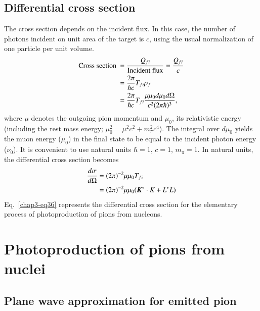 \subsection{Differential cross section}\label{chap3-sec4.2}

The cross section depends on the incident flux. In this case, the number of photons incident on unit area of the target is $c$, using the usual normalization of one particle per unit volume.
\begin{align}
  \text{Cross section}~ & = \frac{Q_{fi}}{\text{Incident flux}} = \frac{Q_{fi}}{c}\notag \\
  & = \frac{2 \pi}{\hbar c} T_{fi} \rho_ f \notag \\
  & = \frac{2\pi}{\hbar c} T_{fi} \frac{\mu \mu_0 d \mu_0 d \Omega}{c^2 (2 \pi \hbar)^3},\label{chap3-eq35}
\end{align}
where $\mu$ denotes the outgoing pion momentum and $\mu_0$, its relativistic energy (including the rest mass energy; $\mu_0^2 = \mu^2 c^2 + m_\pi^2 c^4$). The integral over $d\mu_0$ yields the muon energy ($\mu_0$) in the final state to be equal to the incident photon energy ($\nu_0$). It is convenient to use natural units $\hbar =1$, $c=1$, $m_\pi =1$. In natural units, the differential cross section becomes
\begin{align}
  \frac{d \sigma}{d \Omega} & = (2 \pi)^{-2} \mu \mu_0 T_{fi}\notag \\
  & = (2 \pi)^{-2} \mu \mu_0 ({\boldsymbol  K^\ast \cdot K} + L^\ast L) \label{chap3-eq36}
\end{align}
Eq.\ \eqref{chap3-eq36} represents the differential cross section for the elementary process of photoproduction of pions from nucleons.

\section{Photoproduction of pions from nuclei}\label{chap3-sec5}

\subsection{Plane wave approximation for emitted pion}\label{chap3-sec5.1}


